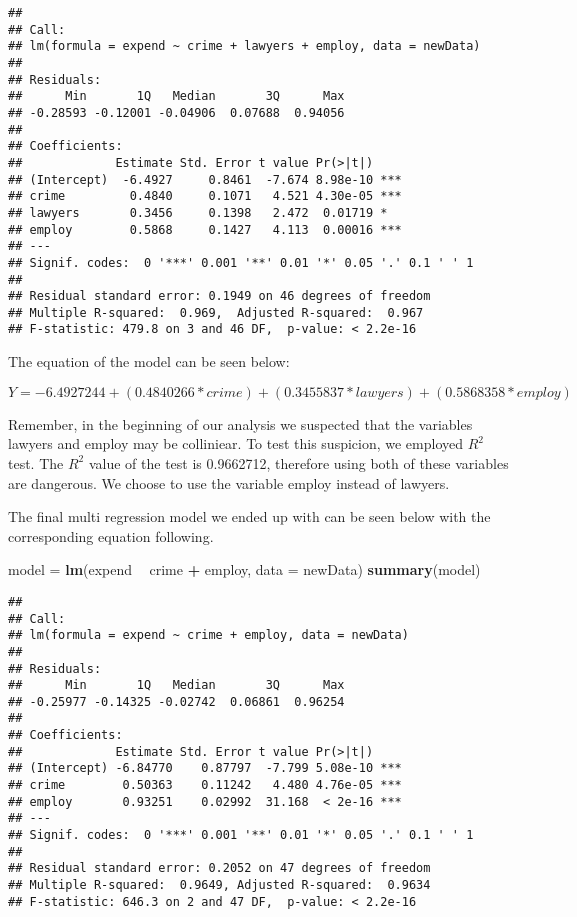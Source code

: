 \documentclass[]{article}
\newenvironment{Shaded}{\begin{snugshade}}{\end{snugshade}}
\newcommand{\KeywordTok}[1]{\textcolor[rgb]{0.13,0.29,0.53}{\textbf{#1}}}
\newcommand{\DataTypeTok}[1]{\textcolor[rgb]{0.13,0.29,0.53}{#1}}
\newcommand{\StringTok}[1]{\textcolor[rgb]{0.31,0.60,0.02}{#1}}
\newcommand{\OperatorTok}[1]{\textcolor[rgb]{0.81,0.36,0.00}{\textbf{#1}}}
\newcommand{\NormalTok}[1]{#1}
\begin{document}
\begin{verbatim}
## 
## Call:
## lm(formula = expend ~ crime + lawyers + employ, data = newData)
## 
## Residuals:
##      Min       1Q   Median       3Q      Max 
## -0.28593 -0.12001 -0.04906  0.07688  0.94056 
## 
## Coefficients:
##             Estimate Std. Error t value Pr(>|t|)    
## (Intercept)  -6.4927     0.8461  -7.674 8.98e-10 ***
## crime         0.4840     0.1071   4.521 4.30e-05 ***
## lawyers       0.3456     0.1398   2.472  0.01719 *  
## employ        0.5868     0.1427   4.113  0.00016 ***
## ---
## Signif. codes:  0 '***' 0.001 '**' 0.01 '*' 0.05 '.' 0.1 ' ' 1
## 
## Residual standard error: 0.1949 on 46 degrees of freedom
## Multiple R-squared:  0.969,  Adjusted R-squared:  0.967 
## F-statistic: 479.8 on 3 and 46 DF,  p-value: < 2.2e-16
\end{verbatim}

The equation of the model can be seen below:

\(Y = -6.4927244 + (0.4840266 * crime) + (0.3455837 * lawyers) + (0.5868358 * employ)\)

Remember, in the beginning of our analysis we suspected that the
variables lawyers and employ may be colliniear. To test this suspicion,
we employed \(R^2\) test. The \(R^2\) value of the test is 0.9662712,
therefore using both of these variables are dangerous. We choose to use
the variable employ instead of lawyers.

The final multi regression model we ended up with can be seen below with
the corresponding equation following.

\begin{Shaded}
\begin{Highlighting}[]
\NormalTok{model =}\StringTok{ }\KeywordTok{lm}\NormalTok{(expend }\OperatorTok{~}\StringTok{ }\NormalTok{crime }\OperatorTok{+}\StringTok{ }\NormalTok{employ, }\DataTypeTok{data =}\NormalTok{ newData)}
\KeywordTok{summary}\NormalTok{(model)}
\end{Highlighting}
\end{Shaded}

\begin{verbatim}
## 
## Call:
## lm(formula = expend ~ crime + employ, data = newData)
## 
## Residuals:
##      Min       1Q   Median       3Q      Max 
## -0.25977 -0.14325 -0.02742  0.06861  0.96254 
## 
## Coefficients:
##             Estimate Std. Error t value Pr(>|t|)    
## (Intercept) -6.84770    0.87797  -7.799 5.08e-10 ***
## crime        0.50363    0.11242   4.480 4.76e-05 ***
## employ       0.93251    0.02992  31.168  < 2e-16 ***
## ---
## Signif. codes:  0 '***' 0.001 '**' 0.01 '*' 0.05 '.' 0.1 ' ' 1
## 
## Residual standard error: 0.2052 on 47 degrees of freedom
## Multiple R-squared:  0.9649, Adjusted R-squared:  0.9634 
## F-statistic: 646.3 on 2 and 47 DF,  p-value: < 2.2e-16
\end{verbatim}
\end{document}
